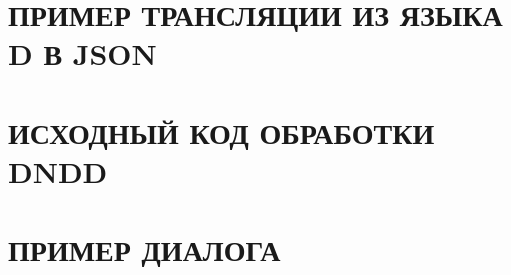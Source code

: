 \renewcommand{\thechapter}{\Asbuk{chapter}}
\chapter{ПРИМЕР ТРАНСЛЯЦИИ ИЗ ЯЗЫКА D В JSON}
\label{app:d2json} %
\chapter{ИСХОДНЫЙ КОД ОБРАБОТКИ DNDD}
\label{app:code}
\chapter{ПРИМЕР ДИАЛОГА}
\label{app:diagogue}